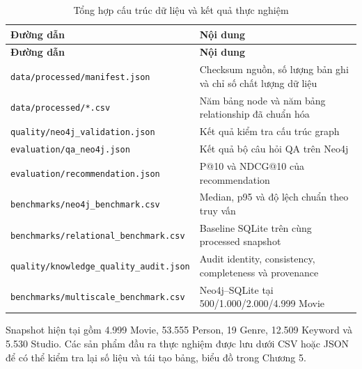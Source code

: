 \begin{longtable}{|>{\raggedright\arraybackslash}p{}|>{\raggedright\arraybackslash}p{}|}
\caption{Tổng hợp cấu trúc dữ liệu và kết quả thực nghiệm}\label{tab:app-2} \\
\hline
\textbf{Đường dẫn} & \textbf{Nội dung} \\ \hline
\endfirsthead\hline \textbf{Đường dẫn} & \textbf{Nội dung} \\ \hline\endhead
\texttt{data/processed/}\linebreak{}\texttt{manifest.json} & Checksum nguồn, số lượng bản ghi và chỉ số chất lượng dữ liệu \\ \hline
\texttt{data/processed/}\linebreak{}\texttt{*.csv} & Năm bảng node và năm bảng relationship đã chuẩn hóa \\ \hline
\texttt{quality/}\linebreak{}\texttt{neo4j\_validation.json} & Kết quả kiểm tra cấu trúc graph \\ \hline
\texttt{evaluation/}\linebreak{}\texttt{qa\_neo4j.json} & Kết quả bộ câu hỏi QA trên Neo4j \\ \hline
\texttt{evaluation/}\linebreak{}\texttt{recommendation.json} & P@10 và NDCG@10 của recommendation \\ \hline
\texttt{benchmarks/}\linebreak{}\texttt{neo4j\_benchmark.csv} & Median, p95 và độ lệch chuẩn theo truy vấn \\ \hline
\texttt{benchmarks/}\linebreak{}\texttt{relational\_benchmark.csv} & Baseline SQLite trên cùng processed snapshot \\ \hline
\texttt{quality/}\linebreak{}\texttt{knowledge\_quality\_audit.json} & Audit identity, consistency, completeness và provenance \\ \hline
\texttt{benchmarks/}\linebreak{}\texttt{multiscale\_benchmark.csv} & Neo4j–SQLite tại 500/1.000/2.000/4.999 Movie \\ \hline
\end{longtable}

Snapshot hiện tại gồm 4.999 Movie, 53.555 Person, 19 Genre, 12.509 Keyword và
5.530 Studio. Các sản phẩm đầu ra thực nghiệm được lưu dưới CSV hoặc JSON để có thể kiểm
tra lại số liệu và tái tạo bảng, biểu đồ trong Chương 5.
